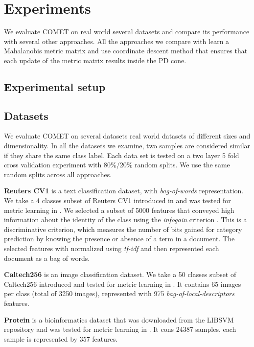 \documentclass{article}
\begin{document}
\section{Experiments}
We evaluate COMET on real world several datasets and compare its performance with several other approaches. All the approaches we compare with learn a Mahalanobis metric matrix and use coordinate descent method that ensures that each update of the metric matrix results inside the PD cone. 
\subsection{Experimental setup}
\subsection{Datasets}
We evaluate COMET on several datasets real world datasets of different sizes and dimensionality. In all the datasets we examine, two samples are considered similar if they share the same class label. Each data set is tested on a two layer 5 fold cross validation experiment with 80\%/20\% random splits. We use the same random splits across all approaches.

\textbf{Reuters CV1} is a text classification dataset, with \textit{bag-of-words} representation. We take a 4 classes subset of Reuters CV1 introduced in \cite{CaiRCV14} and was tested for metric learning in \cite{hdsl}. We selected a subset of 5000 features that conveyed high information about the identity of the class using the \textit{infogain} criterion \cite{infogain}. This is a discriminative criterion, which measures the number of bits gained for category prediction by knowing the presence or absence of a term in a document. The selected features with normalized using \textit{tf-idf} and then represented each document as a bag of words.  

\textbf{Caltech256} is an image classification dataset.   We take a 50 classes subset of Caltech256 introduced and tested for metric learning in \cite{oasis}. It contains 65 images per class (total of 3250 images), represented with 975 \textit{bag-of-local-descriptors} features.


\textbf{Protein} is a bioinformatics dataset that was downloaded from the LIBSVM repository \cite{libsvm} and was tested for metric learning  in \cite{qian}. It cons 24387 samples, each sample is represented by 357 features. 
\end{document}

